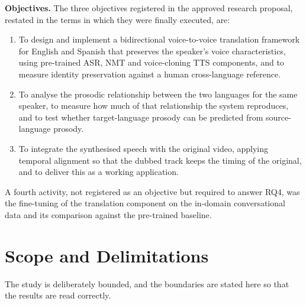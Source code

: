 \textbf{Objectives.} The three objectives registered in the approved research proposal, restated
in the terms in which they were finally executed, are:

\begin{enumerate}[label=\textbf{O\arabic*.}, leftmargin=3.0em]
  \item To design and implement a bidirectional voice-to-voice translation framework for English
        and Spanish that preserves the speaker's voice characteristics, using pre-trained ASR, NMT
        and voice-cloning TTS components, and to measure identity preservation against a human
        cross-language reference.
  \item To analyse the prosodic relationship between the two languages for the same speaker, to
        measure how much of that relationship the system reproduces, and to test whether
        target-language prosody can be predicted from source-language prosody.
  \item To integrate the synthesised speech with the original video, applying temporal alignment
        so that the dubbed track keeps the timing of the original, and to deliver this as a working
        application.
\end{enumerate}

A fourth activity, not registered as an objective but required to answer RQ4, was the fine-tuning
of the translation component on the in-domain conversational data and its comparison against the
pre-trained baseline.

\section{Scope and Delimitations}
\label{sec:scope}

The study is deliberately bounded, and the boundaries are stated here so that the results are read
correctly.

